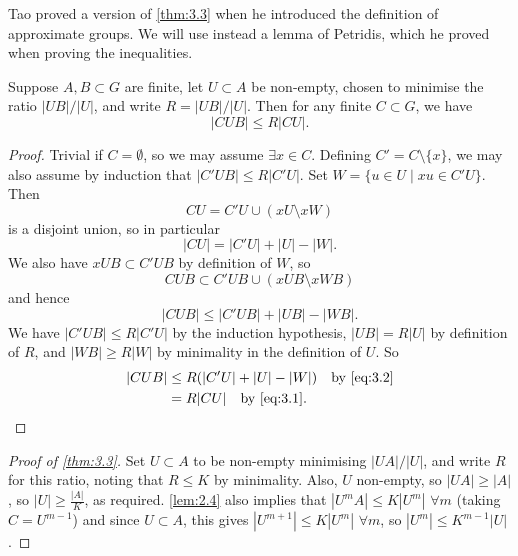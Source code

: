 \documentclass{article}
\numberwithin{equation}{section}
\begin{document}
Tao proved a version of \cref{thm:3.3} when he introduced the definition of approximate groups.
We will use instead a lemma of Petridis, which he proved when proving the  inequalities.

\begin{nlemma}[Petridis]\label{lem:3.4}
  Suppose $A,B \subset G$ are finite, let $U \subset A$ be non-empty, chosen to minimise the ratio $|UB|/|U|$, and write $R = |UB|/|U|$.
  Then for any finite $C \subset G$, we have
  \begin{equation*}
    |CUB| \leq R |CU|.
  \end{equation*}
\end{nlemma}
\begin{proof}
  Trivial if $C = \emptyset$, so we may assume $\exists x \in C$. Defining $C' = C \setminus \{x\}$, we may also assume by induction that $|C' U B| \leq R |C' U|$.
  Set $W = \{u \in U \mid xu \in C' U\}$. Then
  \begin{equation*}
    CU = C' U \cup (x U \setminus x W)
  \end{equation*}
  is a disjoint union, so in particular
  \begin{equation}
    |CU| = |C' U| + |U| - |W|. \label{eq:3.1}
  \end{equation}
  We also have $x U B \subset C' U B$ by definition of $W$, so
  \begin{equation*}
    CUB \subset C' U B \cup (x U B \setminus x W B)
  \end{equation*}
  and hence
  \begin{equation}
    |CUB| \leq |C' U B| + |UB| - |WB|. \label{eq:3.2}
  \end{equation}
  We have $|C' U B| \leq R |C' U|$ by the induction hypothesis, $|UB| = R|U|$ by definition of $R$, and $|WB| \geq R|W|$ by minimality in the definition of $U$. So
  \begin{align*}
    |CUB| &\leq R (|C' U| + |U| - |W|) \quad \text{by }\eqref{eq:3.2} \\
          &= R |CU| \quad \text{by }\eqref{eq:3.1} \qedhere.
  \end{align*}
\end{proof}
\begin{proof}[Proof of \cref{thm:3.3}]
  Set $U \subset A$ to be non-empty minimising $|UA| / |U|$, and write $R$ for this ratio, noting that $R \leq K$ by minimality.
  Also, $U$ non-empty, so $|UA| \geq |A|$, so $|U| \geq \frac{|A|}{K}$, as required.
  \cref{lem:2.4} also implies that $|U^m A| \leq K|U^m|$ $\forall m$ (taking $C = U^{m-1}$) and since $U \subset A$, this gives $|U^{m+1}| \leq K |U^m|$ $\forall m$, so $|U^m| \leq K^{m-1} |U|$.
\end{proof}
\end{document}
